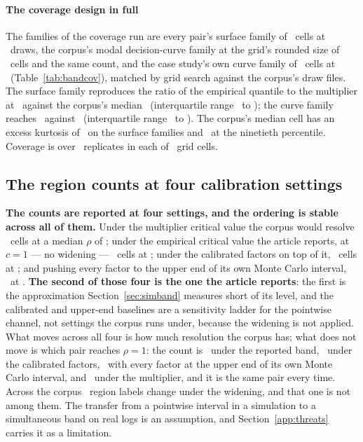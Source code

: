 \paragraph{The coverage design in full}
The families of the coverage run are every pair's surface family of
\nCellsPerPairMedian\ cells at \nDrawsSurface\ draws, the corpus's modal
decision-curve family at the grid's rounded size of \nDcaFamilyModal\ cells
and the same count, and the case study's own curve family of \nDcaFamily\
cells at \nDcaDraws\ (Table~\ref{tab:bandcov}), matched by grid search
against the corpus's draw files. The surface family reproduces the ratio of
the empirical quantile to the multiplier at \ratioSynthWhole\ against the
corpus's median \ratioCorpusWhole\ (interquartile range
\ratioCorpusWholeQone\ to \ratioCorpusWholeQthree); the curve family reaches
\ratioSynthDca\ against \ratioCorpusDca\ (interquartile range
\ratioCorpusDcaQone\ to \ratioCorpusDcaQthree). The corpus's median cell has
an excess kurtosis of \corpusKurtMedWhole\ on the surface families and
\corpusKurtNinetyWhole\ at the ninetieth percentile. Coverage is over
\nBandCoverageReps\ replicates in each of \nBandCoverageCells\ grid cells.

\subsection{The region counts at four calibration settings}
\label{app:foursettings}


\textbf{The counts are reported at four settings, and the ordering is stable
across all of them.} Under the multiplier critical value the corpus would
resolve \nResolvedWholeMult\ cells at a median $\rho$ of \rhoMedianMult;
under the empirical critical value the article reports, at $c = 1$ ---
no widening --- \nResolvedSensNominal\ cells at \rhoSensNominal; under the
calibrated factors on top of it, \nResolvedSensCalibrated\ cells at
\rhoSensCalibrated; and pushing every factor to the upper end of its own
Monte Carlo interval, \nResolvedSensUpper\ at \rhoSensUpper. \textbf{The
second of those four is the one the article reports}: the first is the
approximation Section~\ref{sec:simband} measures short of its level, and
the calibrated and upper-end baselines are a sensitivity ladder for the
pointwise channel, not settings the corpus runs under, because the widening
is not applied. What moves across all four is how much resolution the
corpus has; what does not move is which pair reaches $\rho = 1$: the count
is \nUnifBenSensNominal\ under the reported band, \nUnifBenSensCalibrated\
under the calibrated factors, \nUnifBenSensUpper\ with every factor at the
upper end of its own Monte Carlo interval, and \nUnifBenSensMult\ under the
multiplier, and it is the same pair every time. Across the corpus
\nRegionsChangedByCalibration\ region labels change under the widening, and
that one is not among them. The transfer from a pointwise interval in a
simulation to a simultaneous band on real logs is an assumption, and
Section~\ref{app:threats} carries it as a limitation.

